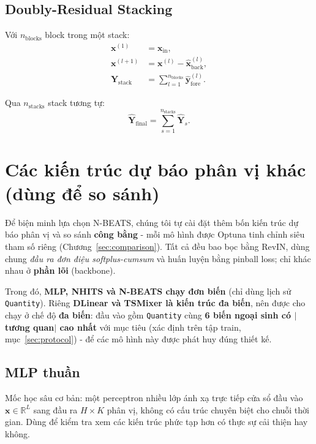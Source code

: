 \documentclass[12pt, a4paper]{report}
\begin{document}
\subsection{Doubly-Residual Stacking}

Với $n_{\text{blocks}}$ block trong một stack:
\begin{align}
  \mathbf{x}^{(1)} &= \mathbf{x}_{\text{in}}, \\
  \mathbf{x}^{(l+1)} &= \mathbf{x}^{(l)} - \hat{\mathbf{x}}^{(l)}_{\text{back}}, \\
  \hat{\mathbf{Y}}_{\text{stack}} &= \sum_{l=1}^{n_{\text{blocks}}} \hat{\mathbf{y}}^{(l)}_{\text{fore}}.
\end{align}

Qua $n_{\text{stacks}}$ stack tương tự:
\begin{equation}
  \hat{\mathbf{Y}}_{\text{final}} = \sum_{s=1}^{n_{\text{stacks}}} \hat{\mathbf{Y}}_s.
\end{equation}

\section{Các kiến trúc dự báo phân vị khác (dùng để so sánh)}
\label{sec:other_models}

Để biện minh lựa chọn N-BEATS, chúng tôi tự cài đặt thêm bốn kiến trúc dự báo phân vị và so sánh \textbf{công bằng} - mỗi mô hình được Optuna tinh chỉnh siêu tham số riêng (Chương~\ref{sec:comparison}). Tất cả đều bao bọc bằng RevIN, dùng chung \textit{đầu ra đơn điệu softplus-cumsum} và huấn luyện bằng pinball loss; chỉ khác nhau ở \textbf{phần lõi} (backbone).

Trong đó, \textbf{MLP, NHITS và N-BEATS chạy đơn biến} (chỉ dùng lịch sử \texttt{Quantity}). Riêng \textbf{DLinear và TSMixer là kiến trúc đa biến}, nên được cho chạy ở chế độ \textbf{đa biến}: đầu vào gồm \texttt{Quantity} cùng \textbf{6 biến ngoại sinh có $|$tương quan$|$ cao nhất} với mục tiêu (xác định trên tập train, mục~\ref{sec:protocol}) - để các mô hình này được phát huy đúng thiết kế.

\subsection{MLP thuần}
Mốc học sâu cơ bản: một perceptron nhiều lớp ánh xạ trực tiếp cửa sổ đầu vào $\mathbf{x} \in \mathbb{R}^L$ sang đầu ra $H \times K$ phân vị, không có cấu trúc chuyên biệt cho chuỗi thời gian. Dùng để kiểm tra xem các kiến trúc phức tạp hơn có thực sự cải thiện hay không.
\end{document}
